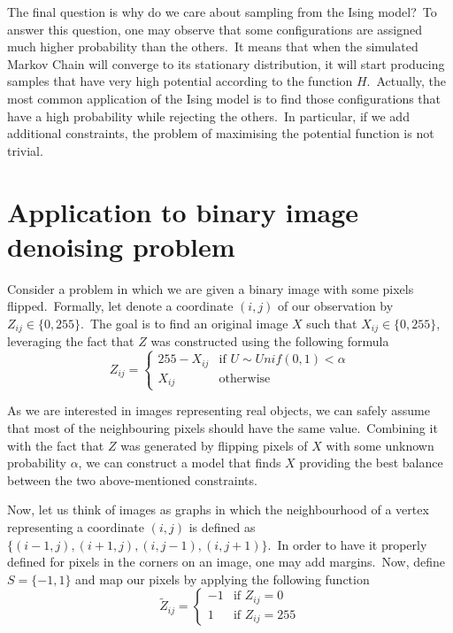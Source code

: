 \documentclass[a4paper, 11pt, onecolumn, openany, titlepage]{report}
\theoremstyle{default_theorem_style}\newtheorem{theorem}{Theorem}
\theoremstyle{default_theorem_style}\newtheorem{definition}{Definition}
\begin{document}
The final question is why do we care about sampling from the Ising model?\ To answer this question, one may observe
that some configurations are assigned much higher probability than the others.\ It means that when the simulated
Markov Chain will converge to its stationary distribution, it will start producing samples that have very high
potential according to the function $H$.\ Actually, the most common application of the Ising model is to find
those configurations that have a high probability while rejecting the others.\ In particular, if we add
additional constraints, the problem of maximising the potential function is not trivial.

\section{Application to binary image denoising problem}\label{section:binary_images_problem}

Consider a problem in which we are given a binary image with some pixels flipped.\ Formally, let denote a coordinate
$(i, j)$ of our observation by $Z_{ij} \in \{0, 255\}$.\ The goal is to find an original image $X$ such that
$X_{ij} \in \{0, 255\}$, leveraging the fact that $Z$ was constructed using the following formula
$$
Z_{ij} =
\begin{cases}
  255 - X_{ij} &\text{if $U \sim Unif(0, 1) < \alpha$}\\
  X_{ij} &\text{otherwise}
\end{cases}
$$

As we are interested in images representing real objects, we can safely assume that most of the neighbouring pixels
should have the same value.\ Combining it with the fact that $Z$ was generated by flipping pixels of $X$ with some
unknown probability $\alpha$, we can construct a model that finds $X$ providing the best balance between the
two above-mentioned constraints.\newline

Now, let us think of images as graphs in which the neighbourhood of a vertex representing a
coordinate $(i, j)$ is defined as $\{(i - 1, j), (i + 1, j), (i, j - 1), (i, j + 1)\}$.\ In
order to have it properly defined for pixels in the corners on an image, one may add margins.\ Now, define
$S = \{-1, 1\}$ and map our pixels by applying the following function
$$
\tilde{Z}_{ij} =
\begin{cases}
  -1 &\text{if $Z_{ij} = 0$}\\
  1 &\text{if $Z_{ij} = 255$}
\end{cases}
$$
\end{document}
